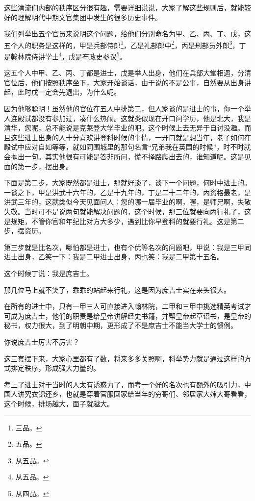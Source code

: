 \begin{multicols}{\theparacolNo}
		这些清流们内部的秩序区分很有趣，需要详细说说，大家了解这些规则后，就能较好的理解明代中期文官集团中发生的很多历史事件。

		我们列举出五个官员来说明这个问题，给他们分别命名为甲、乙、丙、丁、戊，这五个人的职务是这样的，甲是兵部侍郎\footnote{三品。}，乙是礼部郎中\footnote{五品。}，丙是刑部员外郎\footnote{从五品。}，丁是翰林院侍讲学士\footnote{从五品。}，戊是布政史参议\footnote{从四品。}。

		这五个人中甲、乙、丙、丁都是进士，戊是举人出身，他们在兵部大堂相遇，分清官位后，他们按照秩序坐下，大家开始谈话，由于说的不是公事，自然要从出身讲起，此时戊一定会先退出，为什么呢。

		因为他够聪明！虽然他的官位在五人中排第二，但人家谈的是进士的事，你一个举人连殿试都没有参加过，凑什么热闹。这就类似现在开口问学历，他是北大，我是清华，您呢，总不能说是克莱登大学毕业的吧。这个时候上去无异于自讨没趣。而且这些进士出身的人十分喜欢讲登科时候的事情，一开口就是想当年，老子如何在殿试中应对自如等等，就如同围城里的那句名言“兄弟我在英国的时候”，时不时就会抛出一句。其实他很有可能是答非所问，慌不择路爬出去的，谁知道呢。这是见面的第一步，摆出身。

		下面是第二步，大家既然都是进士，那就好谈了，谈下一个问题，何时中进士的。一谈之下，甲是洪武十六年的，乙是十九年的，丁是二十二年的，丙资格最老，是洪武三年的，这就类似今天见面问人：您的哪一届毕业的啊，喔，是师兄啊，失敬失敬。当时可不是说两句就能解决问题的，这个时候，那三位就要向丙行礼了，这是规矩，不管你官和年纪比对方大多少，遇到比你早登科的就要行礼。这是第二步，摆资历。

		第三步就是比名次，哪怕都是进士，也有个优等名次的问题吧，甲说：我是三甲同进士出身，乙笑一下：我是二甲进士出身，丙也笑：我是二甲第十五名。

		这个时候丁说：我是庶吉士。

		那几位马上就不笑了，乖乖的站起来行礼，这是因为庶吉士实在来头很大。

		在所有的进士中，只有一甲三人可直接进入翰林院，二甲和三甲中挑选精英考试才可成为庶吉士，他们的职责是给皇帝讲解经史书籍，并帮皇帝起草诏书，是皇帝的秘书，权力很大，到了明朝中期，更形成了不是庶吉士不能当大学士的惯例。

		你说庶吉士厉害不厉害？

		这三套摆下来，大家心里都有了数，将来多多关照啊，科举势力就是通过这样的方式排定秩序，形成强大力量的。

		考上了进士对于当时的人太有诱惑力了，而考一个好的名次也有额外的吸引力，中国人讲究衣锦还乡，也就是穿着官服回家给当年的穷哥们、邻居家大婶大哥看看，这个时候，排场越大，面子就越大。


\end{multicols}
